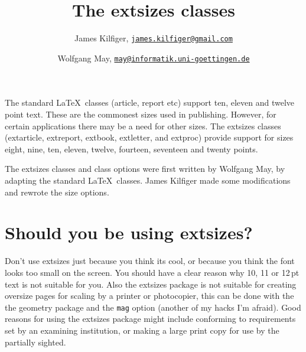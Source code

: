 ﻿%
\usepackage{fixltx2e}
\usepackage{etex}
\usepackage{lmodern}
\usepackage[T1]{fontenc}
\usepackage{textcomp}
\usepackage{microtype}
\usepackage[unicode=true]{hyperref}

\newcommand*{\mail}[1]{\href{mailto:#1}{\texttt{#1}}}
\newcommand*{\pkg}[1]{\textsf{#1}}
\newcommand*{\cls}[1]{\textsf{#1}}
\newcommand*{\cs}[1]{\texttt{\textbackslash#1}}
\makeatletter
\newcommand*{\cmd}[1]{\cs{\expandafter\@gobble\string#1}}
\makeatother
\newcommand*{\opt}[1]{\texttt{#1}}


\title{The \cls{extsizes} classes}
\author{James Kilfiger, \mail{james.kilfiger@gmail.com}\and Wolfgang May, \mail{may@informatik.uni-goettingen.de}}
\date{}




\maketitle

\noindent
The standard \LaTeX\ classes (\cls{article}, \cls{report} etc) support ten, eleven and
twelve point text. These are the commonest sizes used in publishing.
However, for certain applications there may be a need for other sizes.
The \cls{extsizes} classes (\cls{extarticle}, \cls{extreport}, \cls{extbook}, \cls{extletter}, and
\cls{extproc}) provide support for sizes eight, nine, ten, eleven, twelve,
fourteen, seventeen and twenty points.

The \cls{extsizes} classes and class options were first written by Wolfgang
May, by adapting the standard \LaTeX\ classes. James Kilfiger
made some modifications and rewrote the size options. 


\section{Should you be using \cls{extsizes}?}

Don't use \cls{extsizes} just because you think its cool, or because you think
the font looks too small on the screen.  You should have a clear reason
why 10, 11 or 12\,pt text is not suitable for you.  Also the \pkg{extsizes}
package is not suitable for creating oversize pages for scaling by a
printer or photocopier, this can be done with the the \pkg{geometry} package
and the \opt{mag} option (another of my hacks I'm afraid).  Good reasons for
using the \pkg{extsizes} package might include conforming to requirements set
by an examining institution, or making a large print copy for use by the
partially sighted.


